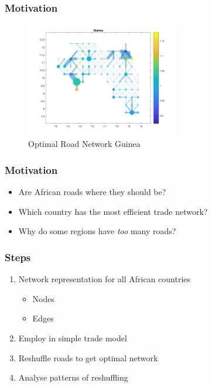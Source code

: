 \documentclass[]{beamer}   	%
\begin{document}
\begin{frame}
  \frametitle{Motivation}
\begin{figure}
    \includegraphics[width=0.6\textwidth, trim={2cm 1cm 1.5cm 0cm},clip]{../../Build/output/Matlab_graphs/Nicer_graphs/Guinea_opt.png}
    \caption{Optimal Road Network Guinea}

  \end{figure}
\end{frame}

\begin{frame}
  \frametitle{Motivation}
  \begin{itemize}
    \item Are African roads where they should be?
    \item Which country has the most efficient trade network?
    \item Why do some regions have \emph{too} many roads?
  \end{itemize}
\end{frame}



\begin{frame}
  \frametitle{Steps}
  \begin{enumerate}
    \item Network representation for all African countries
    \begin{itemize}
      \item Nodes
      \item Edges
    \end{itemize}
    \item Employ in simple trade model
    \item Reshuffle roads to get optimal network
    \item Analyse patterns of reshuffling
  \end{enumerate}
\end{frame}
\end{document}
